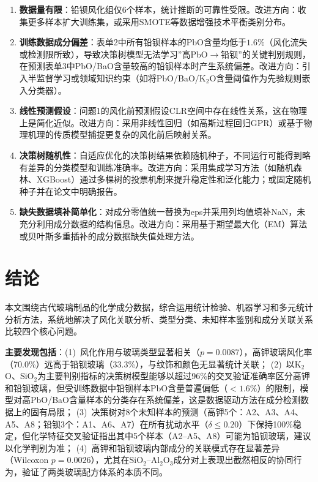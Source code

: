 \documentclass[12pt,a4paper]{ctexart}
\begin{document}
\begin{enumerate}[label=(\arabic*), leftmargin=*]
    \item \textbf{数据量有限}：铅钡风化组仅6个样本，统计推断的可靠性受限。改进方向：收集更多样本扩大训练集，或采用SMOTE等数据增强技术平衡类别分布。
    \item \textbf{训练数据成分偏差}：表单2中所有铅钡样本的PbO含量均低于$1.6\%$（风化流失或检测限所致），导致决策树模型无法学习”高PbO$\rightarrow$铅钡”的关键判别规则，在预测表单3中PbO/BaO含量较高的铅钡样本时产生系统偏差。改进方向：引入半监督学习或领域知识约束（如将PbO/BaO/K$_2$O含量阈值作为先验规则嵌入分类器）。
    \item \textbf{线性预测假设}：问题1的风化前预测假设CLR空间中存在线性关系，这在物理上是简化近似。改进方向：采用非线性回归（如高斯过程回归GPR）或基于物理机理的传质模型捕捉更复杂的风化前后映射关系。
    \item \textbf{决策树随机性}：自适应优化的决策树结果依赖随机种子，不同运行可能得到略有差异的分类模型和训练准确率。改进方向：采用集成学习方法（如随机森林、XGBoost）通过多棵树的投票机制来提升稳定性和泛化能力；或固定随机种子并在论文中明确报告。
    \item \textbf{缺失数据填补简单化}：对成分零值统一替换为eps并采用列均值填补NaN，未充分利用成分数据的结构信息。改进方向：采用基于期望最大化（EM）算法或贝叶斯多重插补的成分数据缺失值处理方法。
\end{enumerate}

\newpage

\section{结论}

本文围绕古代玻璃制品的化学成分数据，综合运用统计检验、机器学习和多元统计分析方法，系统地解决了风化关联分析、类型分类、未知样本鉴别和成分关联关系比较四个核心问题。

\textbf{主要发现包括}：(1)~风化作用与玻璃类型显著相关（$p=0.0087$），高钾玻璃风化率（70.0\%）远高于铅钡玻璃（33.3\%），与纹饰和颜色无显著统计关联；
(2)~以K$_2$O、SiO$_2$为主要判别指标的决策树模型能够以超过96\%的交叉验证准确率区分高钾和铅钡玻璃，但受训练数据中铅钡样本PbO含量普遍偏低（$<1.6\%$）的限制，模型对高PbO/BaO含量样本的分类存在系统偏差，这是数据驱动方法在成分检测数据上的固有局限；
(3)~决策树对8个未知样本的预测（高钾5个：A2、A3、A4、A5、A8；铅钡3个：A1、A6、A7）在所有扰动水平（$\delta\le0.20$）下保持100\%稳定，但化学特征交叉验证指出其中5个样本（A2--A5、A8）可能为铅钡玻璃，建议以化学判别为准；
(4)~高钾和铅钡玻璃内部成分的关联模式存在显著差异（Wilcoxon $p=0.0026$），尤其在SiO$_2$--Al$_2$O$_3$成分对上表现出截然相反的协同行为，验证了两类玻璃配方体系的本质不同。
\end{document}
